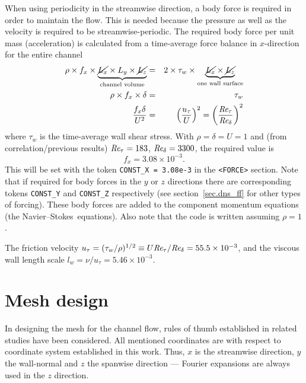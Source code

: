 \documentclass[11pt]{report}
\def\Rey{\mbox{\it Re}}                             %
\newcommand\NavSto{Navier--Stokes}
\begin{document}
When using periodicity in the streamwise direction, a body force is
required in order to maintain the flow.  This is needed because the
pressure as well as the velocity is required to be
streamwise-periodic. The required body force per unit mass
(\ie acceleration) is calculated from a time-average force balance in
$x$-direction for the entire channel
\begin{eqnarray*}
 \rho \times f_x \times
  \underbrace{\cancel{L_x} \times L_y \times \cancel{L_z}}_{\text{channel
    volume}}  &=& 2 \times \tau_w \times \underbrace{\cancel{L_x} \times
    \cancel{L_z}}_{\text{one wall surface}} \\ 
   \rho \times f_x \times \delta & = & \tau_w\\
    \frac{f_x\delta}{U^2} & = & \left(\frac{u_\tau}{U}\right)^2 = 
    \left(\frac{\Rey_\tau}{\Rey_\delta}\right)^2
  \label{eq:force_balance}
\end{eqnarray*}
where $\tau_w$ is the time-average wall shear stress.  With $\rho =
\delta = U= 1$ and (from correlation/previous results)
$\Rey_\tau=183$, $\Rey_\delta=3300$, the required value is
\[
  f_x = 3.08 \times 10^{-3} .
\]
This will be set with the token \texttt{CONST\_X = 3.08e-3} in the 
\texttt{<FORCE>} section.  Note that if
required for body forces in the $y$ or $z$ directions there are
corresponding tokens \texttt{CONST\_Y} and \texttt{CONST\_Z} respectively 
(see section~\ref{sec.dns_ff} for other types of forcing).
These body forces are added to the component momentum equations (the
\NavSto\ equations).  Also note that the code is written assuming
$\rho=1$.

The friction velocity $u_\tau=(\tau_w/\rho)^{1/2}\equiv
U\Rey_\tau/\Rey_\delta=55.5\times10^{-3}$, and the viscous wall length
scale $l_w=\nu/u_\tau=5.46\times10^{-3}$.

\section{Mesh design}
\label{sec.meshdesign}

In designing the mesh for the channel flow, rules of thumb established
in related studies \citep{pio97,kmm87,blsc03} have been
considered. All mentioned coordinates are with respect to coordinate
system established in this work. Thus, $x$ is the streamwise
direction, $y$ the wall-normal and $z$ the spanwise direction ---
Fourier expansions are always used in the $z$ direction.
\end{document}
